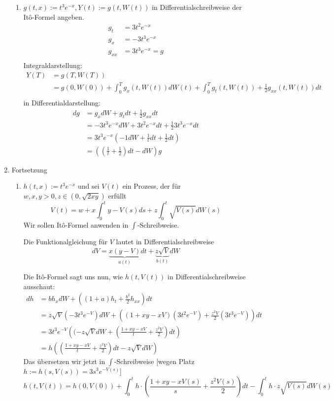 \documentclass[a4paper,11pt,notitlepage,fullpage]{article}
\begin{document}
\begin{enumerate}
\begin{enumerate}
\item $g(t,x):= t^3e^{-x}, Y(t):=g(t, W(t))$ in Differentialschreibweise der Itô-Formel angeben.
\begin{align*}
g_t &= 3t^2e^{-x}\\
g_x &= -3t^3e^{-x}\\
g_{xx} &= 3t^3e^{-x} = g\\
\end{align*}
Integraldarstellung:
\begin{align*}
Y(T) &= g(T, W(T))\\
&= g(0, W(0)) + \int_0^T g_x(t, W(t)) dW(t) + \int_0^T g_t(t, W(t)) + \frac{1}{2} g_{xx}(t, W(t)) dt\\
\end{align*}
in Differentialdarstellung:
\begin{align*}
dg &= g_x dW + g_t dt + \frac{1}{2} g_{xx} dt\\
&= -3t^3e^{-x} dW + 3t^2e^{-x} dt + \frac{1}{2} 3t^3e^{-x} dt\\
&= 3t^3e^{-x} \left(-1dW + \frac{1}{t} dt +\frac{1}{2} dt \right)\\
&= \left(\left(\frac{1}{t} + \frac{1}{2}\right)dt - dW \right)g
\end{align*}

\end{enumerate}

\item Fortsetzung
\begin{enumerate}
\item $h(t,x):= t^3e^{-x}$ und sei $V(t)$ ein Prozess, der für $w,x,y>0, z\in (0, \sqrt{2xy})$ erfüllt
$$V(t) = w + x\int_0^t y-V(s) ds + z\int_0^t \sqrt{V(s)} dW(s)$$
Wir sollen Itô-Formel anwenden in $\int$-Schreibweise.

Die Funktionalgleichung für $V$ lautet in Differentialschreibweise
$$dV = \underbrace{x(y-V)}_{a(t)}dt + \underbrace{z\sqrt{V}}_{b(t)}dW$$

Die Itô-Formel sagt uns nun, wie $h(t, V(t))$ in Differentialschreibweise ausschaut:
\begin{align*}
dh &= b h_x dW + \left( (1+a)h_t +\frac{b^2}{2} h_{xx}  \right) dt\\
&= z\sqrt{V} (-3t^3e^{-V}) dW + \left( (1+xy-xV) (3t^2e^{-V}) + \frac{z^2V}{2} (3t^3e^{-V})  \right) dt\\
&= 3t^3e^{-V} \left((-z\sqrt{V}dW + \left(\frac{1+xy-xV}{t} + \frac{z^2V}{2} \right) dt \right)\\
&= h \left(\left(\frac{1+xy-xV}{t} + \frac{z^2V}{2} \right) dt  -z\sqrt{V}dW \right)
\end{align*}
Das übersetzen wir jetzt in $\int$-Schreibweise [wegen Platz $h:=h(s,V(s))=3s^3e^{-V(s)}$]
$$h(t,V(t)) = h(0, V(0)) + \int_0^t h\cdot\left(\frac{1+xy-xV(s)}{s} + \frac{z^2V(s)}{2}\right) dt  - \int_0^t h\cdot z\sqrt{V(s)}dW(s)$$


\end{enumerate}
\end{enumerate}
\end{document}
